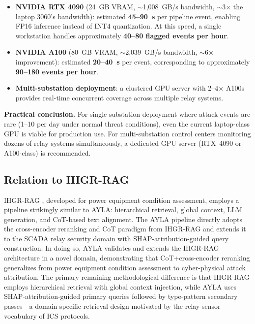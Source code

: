 \documentclass[twocolumn, 10pt, letterpaper]{article}
\begin{document}
\begin{itemize}
    \item \textbf{NVIDIA RTX 4090} (24~GB VRAM, $\sim$1,008~GB/s bandwidth,
          $\sim$3$\times$ the laptop 3060's bandwidth): estimated \textbf{45--90~s}
          per pipeline event, enabling FP16 inference instead of INT4 quantization.
          At this speed, a single workstation handles approximately
          \textbf{40--80 flagged events per hour}.

    \item \textbf{NVIDIA A100} (80~GB VRAM, $\sim$2,039~GB/s bandwidth,
          $\sim$6$\times$ improvement): estimated \textbf{20--40~s} per event,
          corresponding to approximately \textbf{90--180 events per hour}.

    \item \textbf{Multi-substation deployment}: a clustered GPU server with
          2--4$\times$ A100s provides real-time concurrent coverage across
          multiple relay systems.
\end{itemize}

\textbf{Practical conclusion.} For single-substation deployment where attack
events are rare (1--10 per day under normal threat conditions), even the current
laptop-class GPU is viable for production use.
For multi-substation control centers monitoring dozens of relay systems
simultaneously, a dedicated GPU server (RTX~4090 or A100-class) is recommended.

\subsection{Relation to IHGR-RAG}

IHGR-RAG \cite{ihgrrag2025}, developed for power equipment condition assessment,
employs a pipeline strikingly similar to AYLA: hierarchical retrieval, global context,
LLM generation, and CoT-based text alignment.
The AYLA pipeline directly adopts the cross-encoder reranking and CoT paradigm
from IHGR-RAG \cite{ihgrrag2025} and extends it to the SCADA relay security domain
with SHAP-attribution-guided query construction.
In doing so, AYLA validates and extends the IHGR-RAG architecture in a novel domain,
demonstrating that CoT+cross-encoder reranking generalizes from power equipment
condition assessment to cyber-physical attack attribution.
The primary remaining methodological difference is that IHGR-RAG employs hierarchical
retrieval with global context injection, while AYLA uses SHAP-attribution-guided
primary queries followed by type-pattern secondary passes---a domain-specific
retrieval design motivated by the relay-sensor vocabulary of ICS protocols.
\end{document}
